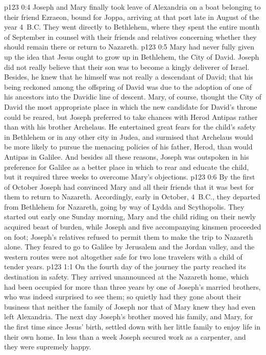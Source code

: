 \pc \vs p123 0:4 Joseph and Mary finally took leave of Alexandria on a boat belonging to their friend Ezraeon, bound for Joppa, arriving at that port late in August of the year 4~B.C. They went directly to Bethlehem, where they spent the entire month of September in counsel with their friends and relatives concerning whether they should remain there or return to Nazareth.
\vs p123 0:5 Mary had never fully given up the idea that Jesus ought to grow up in Bethlehem, the City of David. Joseph did not really believe that their son was to become a kingly deliverer of Israel. Besides, he knew that he himself was not really a descendant of David; that his being reckoned among the offspring of David was due to the adoption of one of his ancestors into the Davidic line of descent. Mary, of course, thought the City of David the most appropriate place in which the new candidate for David’s throne could be reared, but Joseph preferred to take chances with Herod Antipas rather than with his brother Archelaus. He entertained great fears for the child’s safety in Bethlehem or in any other city in Judea, and surmised that Archelaus would be more likely to pursue the menacing policies of his father, Herod, than would Antipas in Galilee. And besides all these reasons, Joseph was outspoken in his preference for Galilee as a better place in which to rear and educate the child, but it required three weeks to overcome Mary’s objections.
\vs p123 0:6 By the first of October Joseph had convinced Mary and all their friends that it was best for them to return to Nazareth. Accordingly, early in October, 4~B.C., they departed from Bethlehem for Nazareth, going by way of Lydda and Scythopolis. They started out early one Sunday morning, Mary and the child riding on their newly acquired beast of burden, while Joseph and five accompanying kinsmen proceeded on foot; Joseph’s relatives refused to permit them to make the trip to Nazareth alone. They feared to go to Galilee by Jerusalem and the Jordan valley, and the western routes were not altogether safe for two lone travelers with a child of tender years.\plusone
{}
\vs p123 1:1 On the fourth day of the journey the party reached its destination in safety. They arrived unannounced at the Nazareth home, which had been occupied for more than three years by one of Joseph’s married brothers, who was indeed surprised to see them; so quietly had they gone about their business that neither the family of Joseph nor that of Mary knew they had even left Alexandria. The next day Joseph’s brother moved his family, and Mary, for the first time since Jesus’ birth, settled down with her little family to enjoy life in their own home. In less than a week Joseph secured work as a carpenter, and they were supremely happy.
